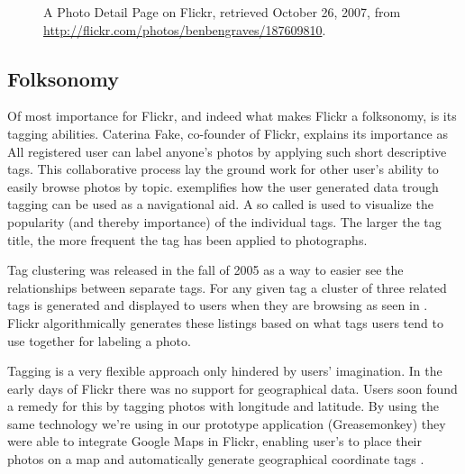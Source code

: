 \begin{figure}
\begin{whole}
\begin{minipage}[t]{0.475\wholewidth}
      \caption[Flickr Photo Detail Page]{%
         A Photo Detail Page on Flickr,
         retrieved October 26, 2007, from
         \url{http://flickr.com/photos/benbengraves/187609810}.}
      \label{figure:scrsh.flickr.photo.detail}
    \end{minipage}
  \end{whole}
  \normalcaption
\end{figure}

\subsection{Folksonomy}
Of most importance
for Flickr, and indeed what makes Flickr a folksonomy, is its tagging
abilities. Caterina Fake, co-founder of Flickr, explains its importance as
All registered user can label anyone's photos by applying such short
descriptive tags. This collaborative process lay the ground work for other
user's ability to easily browse photos by topic.
exemplifies how the user generated data trough tagging can be used as a
navigational aid. A so called  is used to visualize the
popularity (and thereby importance) of the individual tags. The larger the
tag title, the more frequent the tag has been applied to photographs.

Tag clustering was released in the fall of 2005 \citep{butterfield05} as a way
to easier see the relationships between separate tags. For any given tag a
cluster of three related tags is generated and displayed to users when they
are browsing as seen in
.
Flickr algorithmically generates these listings based on what tags users tend
to use together for labeling a photo.

Tagging is a very flexible approach only hindered by users' imagination. In
the early days of Flickr there was no support for geographical data. Users
soon found a remedy for this by tagging photos with longitude and latitude.
By using the same technology we're using in our prototype application
(Greasemonkey) they were able to integrate Google Maps%
 in Flickr, enabling user's to place their photos on a map and automatically
generate geographical coordinate tags%
.


